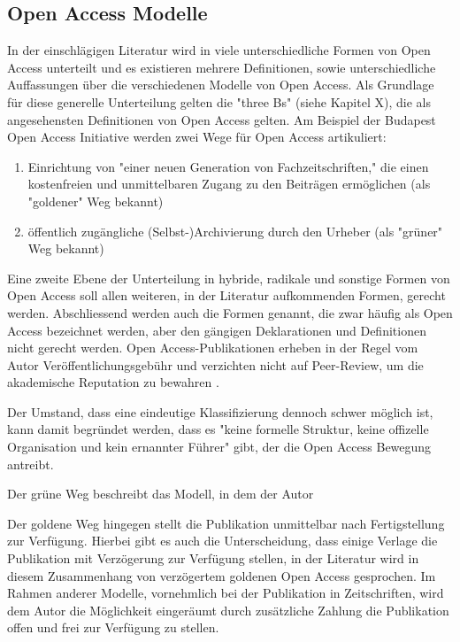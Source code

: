 \subsection{Open Access Modelle}

In der einschlägigen Literatur wird in viele unterschiedliche Formen von Open Access unterteilt und es existieren mehrere Definitionen\cite{CREATe_2014}\cite{albert_2006_open_implications}, sowie unterschiedliche Auffassungen über die verschiedenen Modelle von Open Access\cite{CREATe_2014}\cite{cite:22b}\cite{lewis_2012_inevitability}. Als Grundlage für diese generelle Unterteilung gelten die "three Bs" (siehe Kapitel X), die als angesehensten Definitionen von Open Access gelten. Am Beispiel der Budapest Open Access Initiative werden zwei Wege für Open Access artikuliert\cite{albert_2006_open_implications}: 
\begin{enumerate}
\item Einrichtung von "einer neuen Generation von Fachzeitschriften," die einen kostenfreien und unmittelbaren Zugang zu den Beiträgen ermöglichen (als "goldener" Weg bekannt)
\item öffentlich zugängliche (Selbst-)Archivierung durch den Urheber (als "grüner" Weg bekannt)
\end{enumerate}

Eine zweite Ebene der Unterteilung in hybride, radikale und sonstige Formen von Open Access soll allen weiteren, in der Literatur aufkommenden Formen, gerecht werden. Abschliessend werden auch die Formen genannt, die zwar häufig als Open Access bezeichnet werden, aber den gängigen Deklarationen \cite{boai_2012} und Definitionen nicht gerecht werden. Open Access-Publikationen erheben in der Regel vom Autor Veröffentlichungsgebühr und verzichten nicht auf Peer-Review, um die akademische Reputation zu bewahren \cite{albert_2006_open_implications} \cite{Open_Access_net_2009}.

Der Umstand, dass eine eindeutige Klassifizierung dennoch schwer möglich ist, kann damit begründet werden, dass es "keine formelle Struktur, keine offizelle Organisation und kein ernannter Führer" gibt, der die Open Access Bewegung antreibt\cite{poynder_2011_suber}.

Der grüne Weg beschreibt das Modell, in dem der Autor

Der goldene Weg hingegen stellt die Publikation unmittelbar nach Fertigstellung zur Verfügung. Hierbei gibt es auch die Unterscheidung, dass einige Verlage die Publikation mit Verzögerung zur Verfügung stellen, in der Literatur wird in diesem Zusammenhang von verzögertem goldenen Open Access gesprochen\cite{lewis_2012_inevitability}. Im Rahmen anderer Modelle, vornehmlich bei der Publikation in Zeitschriften, wird dem Autor die Möglichkeit eingeräumt durch zusätzliche Zahlung die Publikation offen und frei zur Verfügung zu stellen\cite{lewis_2012_inevitability}.

